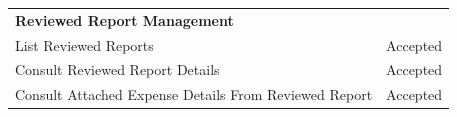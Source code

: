 \begin{longtable}{p{} p{}}
    \rowcolor{gray!20}
    \textbf{Reviewed Report Management} & \\ 
    \rowcolor{gray!05}
    List Reviewed Reports & Accepted \\
    \rowcolor{gray!05}
    Consult Reviewed Report Details & Accepted \\
    \rowcolor{gray!05}
    Consult Attached Expense Details From Reviewed Report & Accepted \\

    \end{longtable}
    \normalsize



